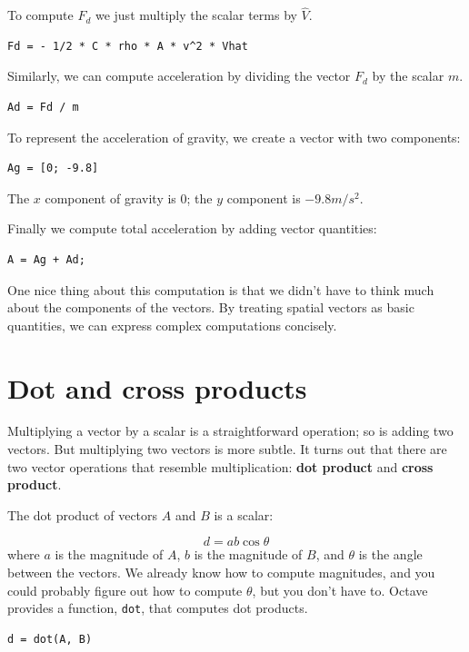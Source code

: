 \documentclass{book}
\begin{document}
To compute $F_d$ we just multiply the scalar terms by $\hat{V}$.

\begin{verbatim}
Fd = - 1/2 * C * rho * A * v^2 * Vhat
\end{verbatim}

Similarly, we can compute acceleration by dividing the vector
$F_d$ by the scalar $m$.

\begin{verbatim}
Ad = Fd / m
\end{verbatim}

To represent the acceleration of gravity, we create a vector 
with two components:

\begin{verbatim}
Ag = [0; -9.8]
\end{verbatim}

The $x$ component of gravity is 0; the $y$ component is $-9.8 m/s^2$.

Finally we compute total acceleration by adding vector
quantities:

\begin{verbatim}
A = Ag + Ad;
\end{verbatim}

One nice thing about this computation is that we didn't have to
think much about the components of the vectors. By treating
spatial vectors as basic quantities, we can express complex computations
concisely.


\section{Dot and cross products}

Multiplying a vector by a scalar is a straightforward operation;
so is adding two vectors. But multiplying two vectors is more
subtle. It turns out that there are two vector operations that
resemble multiplication: {\bf dot product}
and {\bf cross product}.

The dot product of vectors $A$ and $B$ is a scalar:

\[ d = a b \cos \theta \]
%
where $a$ is the magnitude of $A$, $b$ is the magnitude of $B$,
and $\theta$ is the angle between the vectors. We already know
how to compute magnitudes, and you could probably figure out
how to compute $\theta$, but you don't have to. Octave provides
a function, {\tt dot}, that computes dot products.

\begin{verbatim}
d = dot(A, B)
\end{verbatim}
\end{document}
